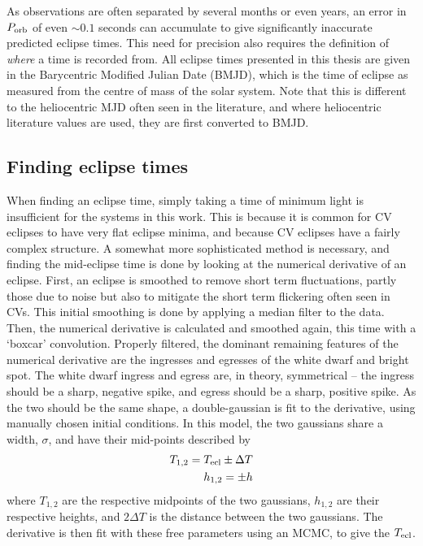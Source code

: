 As observations are often separated by several months or even years, an error in $P_{\rm orb}$ of even $\sim 0.1$ seconds can accumulate to give significantly inaccurate predicted eclipse times. This need for precision also requires the definition of {\it where} a time is recorded from. All eclipse times presented in this thesis are given in the Barycentric Modified Julian Date (BMJD), which is the time of eclipse as measured from the centre of mass of the solar system. Note that this is different to the heliocentric MJD often seen in the literature, and where heliocentric literature values are used, they are first converted to BMJD. 

\subsection{Finding eclipse times}
\label{sect:modelling:finding eclipse times}

When finding an eclipse time, simply taking a time of minimum light is insufficient for the systems in this work. This is because it is common for CV eclipses to have very flat eclipse minima, and because CV eclipses have a fairly complex structure. 
A somewhat more sophisticated method is necessary, and finding the mid-eclipse time is done by looking at the numerical derivative of an eclipse. 
First, an eclipse is smoothed to remove short term fluctuations, partly those due to noise but also to mitigate the short term flickering often seen in CVs. This initial smoothing is done by applying a median filter to the data. Then, the numerical derivative is calculated and smoothed again, this time with a `boxcar' convolution. Properly filtered, the dominant remaining features of the numerical derivative are the ingresses and egresses of the white dwarf and bright spot. 
The white dwarf ingress and egress are, in theory, symmetrical -- the ingress should be a sharp, negative spike, and egress should be a sharp, positive spike. As the two should be the same shape, a double-gaussian is fit to the derivative, using manually chosen initial conditions. In this model, the two gaussians share a width, $\sigma$, and have their mid-points described by
\begin{align*}
    T_{\rm 1,2} = T_{\rm ecl} \pm \Delta T \\
    h_{\rm 1,2} = \pm h
\end{align*}
where $T_{1,2}$ are the respective midpoints of the two gaussians, $h_{1,2}$ are their respective heights, and $2\Delta T$ is the distance between the two gaussians. 
The derivative is then fit with these free parameters using an MCMC, to give the $T_{\rm ecl}$.

